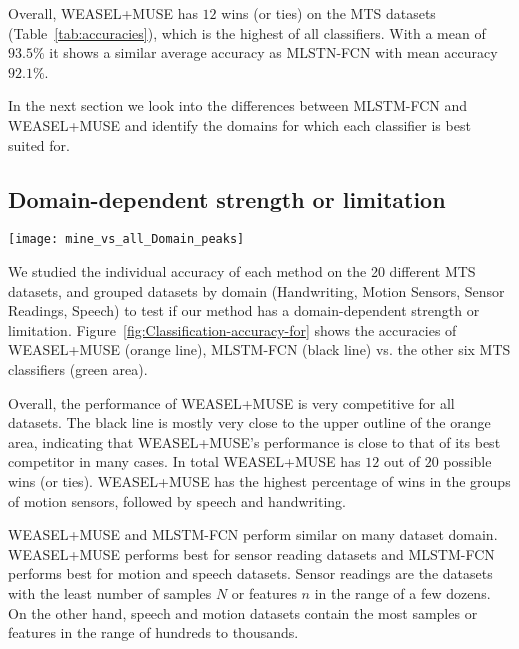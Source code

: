 \documentclass[sigconf]{acmart}
\begin{document}
Overall, WEASEL+MUSE has $12$ wins (or ties) on the MTS datasets (Table~\ref{tab:accuracies}), which is the  highest of all classifiers. With a mean of $93.5\%$ it shows a similar average accuracy as MLSTN-FCN with mean accuracy $92.1\%$.

In the next section we look into the differences between MLSTM-FCN and WEASEL+MUSE and identify the domains for which each classifier is best suited for.

\subsection{Domain-dependent strength or limitation}\label{subsec:accuracy_by_dataset_and_domain}

\begin{figure*}[t]
	\texttt{[image: mine\_vs\_all\_Domain\_peaks]}
	\caption{Classification accuracies on the $20$ MTS datasets for WEASEL+MUSE (orange), MLSTM-FCN (black) vs six state-of-the-art MTSC. The green area represents the classifiers' accuracies.\label{fig:Classification-accuracy-for}}
\end{figure*}

We studied the individual accuracy of each method on the 20 different MTS datasets, and grouped datasets by domain (Handwriting, Motion Sensors, Sensor Readings, Speech) to test if our method has a domain-dependent strength or limitation. 
Figure~\ref{fig:Classification-accuracy-for} shows the accuracies of WEASEL+MUSE (orange line), MLSTM-FCN (black line)  vs. the other six MTS classifiers (green area).

Overall, the performance of WEASEL+MUSE is very competitive for all datasets. The black line is mostly very close to the upper outline of the orange area, indicating that WEASEL+MUSE's performance is close to that of its best competitor in many cases. In total WEASEL+MUSE has $12$ out of $20$ possible wins (or ties). WEASEL+MUSE has the highest percentage of wins in the  groups of motion sensors, followed by speech and handwriting. 

WEASEL+MUSE and MLSTM-FCN perform similar on many dataset domain. WEASEL+MUSE performs best for sensor reading datasets and MLSTM-FCN performs best for motion and speech datasets. Sensor readings are the datasets with the least number of samples $N$ or features $n$ in the range of a few dozens. On the other hand, speech and motion datasets contain the most samples or features in the range of hundreds to thousands. 
\end{document}

